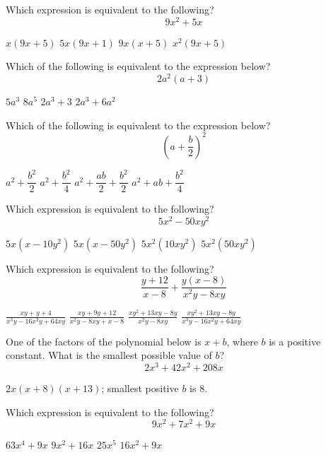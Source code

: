 \question[1]
Which expression is equivalent to the following?
\[
  9 x^{2}+5 x
\]
\begin{choices}
  \CorrectChoice $x(9 x+5)$
  \choice $5 x(9 x+1)$
  \choice $9 x(x+5)$
  \choice $x^{2}(9 x+5)$
\end{choices}

\question[1]
Which of the following is equivalent to the expression below?
\[
  2 a^{2}(a+3)
\]
\begin{choices}
  \choice $5 a^{3}$
  \choice $8 a^{5}$
  \choice $2 a^{3}+3$
  \CorrectChoice $2 a^{3}+6 a^{2}$
\end{choices}


\newpage

\question[1]
Which of the following is equivalent to the expression below?
\[
  \left(a+\frac{b}{2}\right)^{2}
\]
\begin{choices}
  \choice $a^{2}+\dfrac{b^{2}}{2}$
  \choice $a^{2}+\dfrac{b^{2}}{4}$
  \choice $a^{2}+\dfrac{a b}{2}+\dfrac{b^{2}}{2}$
  \CorrectChoice $a^{2}+a b+\dfrac{b^{2}}{4}$
\end{choices}

\question[1]
Which expression is equivalent to the following?
\[
  5 x^{2}-50 x y^{2}
\]
\begin{choices}
  \CorrectChoice $5 x\left(x-10 y^{2}\right)$
  \choice $5 x\left(x-50 y^{2}\right)$
  \choice $5 x^{2}\left(10 x y^{2}\right)$
  \choice $5 x^{2}\left(50 x y^{2}\right)$
\end{choices}

\question[1]
Which expression is equivalent to the following?
\[
  \frac{y+12}{x-8}+\frac{y(x-8)}{x^{2} y-8 x y}
\]
\begin{choices}
  \choice $\displaystyle\frac{x y+y+4}{x^{3} y-16 x^{2} y+64 x y}$
  \choice $\displaystyle\frac{x y+9 y+12}{x^{2} y-8 x y+x-8}$
  \CorrectChoice $\displaystyle\frac{x y^{2}+13 x y-8 y}{x^{2} y-8 x y}$
  \choice $\displaystyle\frac{x y^{2}+13 x y-8 y}{x^{3} y-16 x^{2} y+64 x y}$
\end{choices}


\newpage

\question[1]
One of the factors of the polynomial below is $x+b$, where $b$ is a positive constant. What is the smallest possible value of $b$?
\[
  2 x^{3}+42 x^{2}+208 x
\]
\begin{solutionorbox}[1in]
  $2x(x+8)(x+13)$; smallest positive $b$ is $8$.
\end{solutionorbox}

\question[1]
Which expression is equivalent to the following?
\[
  9 x^{2}+7 x^{2}+9 x
\]
\begin{choices}
  \choice $63 x^{4}+9 x$
  \choice $9 x^{2}+16 x$
  \choice $25 x^{5}$
  \CorrectChoice $16 x^{2}+9 x$
\end{choices}

